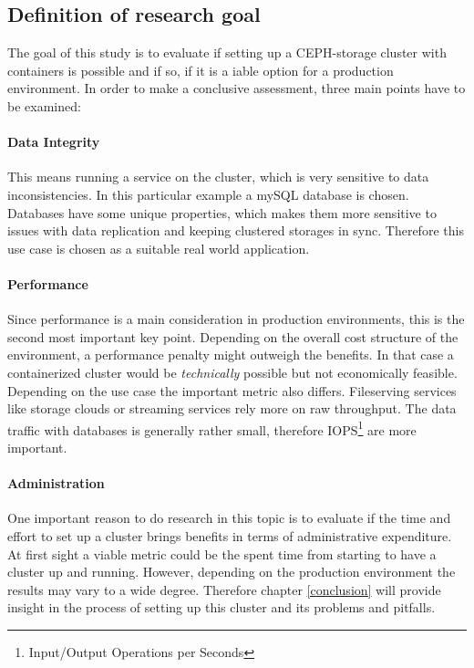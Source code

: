 \documentclass[titlepage, a4paper, 11pt]{scrartcl}
\begin{document}
        \subsection{Definition of research goal}\label{research-goal}
        
            The goal of this study is to evaluate if setting up a CEPH-storage cluster with containers is possible and if so, 
            if it is a iable option for a production environment. In order to make a conclusive assessment, three main points 
            have to be examined:

            \paragraph{Data Integrity}

                This means running a service on the cluster, which is very sensitive to data inconsistencies.
                In this particular example a mySQL database is chosen. Databases have some unique properties, which makes them more sensitive 
                to issues with data replication and keeping clustered storages in sync. 
                Therefore this use case is chosen as a suitable real world application.

            \paragraph{Performance}

                Since performance is a main consideration in production environments, this is 
                the second most important key point. Depending on the overall cost structure of the environment, 
                a performance penalty might outweigh the benefits. In that case a containerized cluster 
                would be \textit{technically} possible but not economically feasible. Depending on the use case
                the important metric also differs. Fileserving services like storage clouds or streaming services 
                rely more on raw throughput. The data traffic with databases is generally rather small, therefore
                IOPS\footnote{Input/Output Operations per Seconds} are more important.

            \paragraph{Administration}

                One important reason to do research in this topic is to evaluate if the time and effort to
                set up a cluster brings benefits in terms of administrative expenditure. At first sight a viable
                metric could be the spent time from starting to have a cluster up and running. However, depending
                on the production environment the results may vary to a wide degree. Therefore chapter \ref*{conclusion}
                will provide insight in the process of setting up this cluster and its problems and pitfalls.
\end{document}

